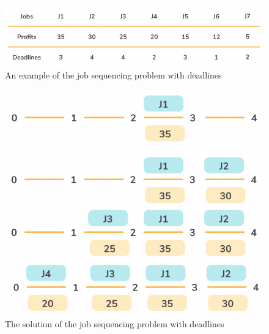\documentclass[a4paper,11pt]{book}
\begin{document}
\begin{figure}[ht]
	\centering
	\includegraphics[scale=0.35]{code/sort/pic/job1.png}
	\caption{An example of the job sequencing problem with deadlines}
\end{figure}

\begin{figure}[ht]
	\centering
	\includegraphics[scale=0.35]{code/sort/pic/job2.png}
	\caption{The solution of the job sequencing problem with deadlines}
\end{figure}
\end{document}
